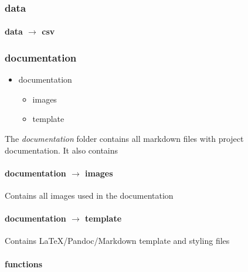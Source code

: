 \documentclass[]{article}
\providecommand{\tightlist}{%
  \setlength{\itemsep}{0pt}\setlength{\parskip}{0pt}}
\let\oldparagraph\paragraph
\renewcommand{\paragraph}[1]{\oldparagraph{#1}\mbox{}}
\begin{document}
\subsubsection{data}\label{data}

\paragraph{\texorpdfstring{data \(\rightarrow\)
csv}{data \textbackslash{}rightarrow csv}}\label{data-rightarrow-csv}

\subsubsection{documentation}\label{documentation}

\begin{itemize}
\tightlist
\item
  documentation

  \begin{itemize}
  \tightlist
  \item
    images
  \item
    template
  \end{itemize}
\end{itemize}

The \emph{documentation} folder contains all markdown files with project
documentation. It also contains

\paragraph{\texorpdfstring{documentation \(\rightarrow\)
images}{documentation \textbackslash{}rightarrow images}}\label{documentation-rightarrow-images}

Contains all images used in the documentation

\paragraph{\texorpdfstring{documentation \(\rightarrow\)
template}{documentation \textbackslash{}rightarrow template}}\label{documentation-rightarrow-template}

Contains LaTeX/Pandoc/Markdown template and styling files

\paragraph{functions}\label{functions}
\end{document}
